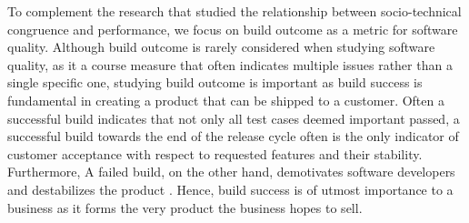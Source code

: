 To complement the research that studied the relationship between socio-technical congruence and performance, we focus on build outcome as a metric for software quality.
Although build outcome is rarely considered when studying software quality, as it a course measure that often indicates multiple issues rather than a single specific one, studying build outcome is important as build success is fundamental in creating a product that can be shipped to a customer.
Often a successful build indicates that not only all test cases deemed important passed, a successful build towards the end of the release cycle often is the only indicator of customer acceptance with respect to requested features and their stability.
Furthermore, A failed build, on the other hand, demotivates software developers \cite{holck2004,damian:icgse:2007} and destabilizes the product \cite{cusumano1997}.
Hence, build success is of utmost importance to a business as it forms the very product the business hopes to sell.
%























